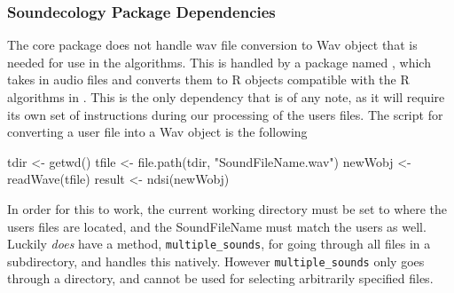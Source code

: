 \subsubsection{Soundecology Package Dependencies}
The core  package does not handle wav file conversion to Wav object that is needed for use in the algorithms. This is handled by a package named , which takes in audio files and converts them to R objects compatible with the R algorithms in . This is the only dependency that is of any note, as it will require its own set of instructions during our processing of the user\textquotesingle s files. The script for converting a user file into a Wav object is the following

\begin{javascriptcode}
  tdir <- getwd()
  tfile <- file.path(tdir, "SoundFileName.wav")
  newWobj <- readWave(tfile)
  result <- ndsi(newWobj)
\end{javascriptcode}

In order for this to work, the current working directory must be set to where the user\textquotesingle s files are located, and the SoundFileName must match the user\textquotesingle s as well. Luckily  \textit{does} have a method, \verb|multiple_sounds|, for going through all files in a subdirectory, and handles this natively. However \verb|multiple_sounds| only goes through a directory, and cannot be used for selecting arbitrarily specified files.
